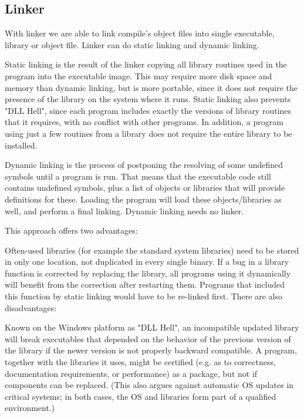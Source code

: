 \subsection{Linker}

With linker we are able to link compile's object files into single executable, library or object file.
Linker can do static linking and dynamic linking.

Static linking is the result of the linker copying all library routines used in the program into the executable image.
This may require more disk space and memory than dynamic linking, but is more portable, since it does not require the presence of the library on the system where it runs.
Static linking also prevents "DLL Hell", since each program includes exactly the versions of library routines that it requires, with no conflict with other programs. In addition, a program using just a few routines from a library does not require the entire library to be installed.

Dynamic linking is the process of postponing the resolving of some undefined symbols until a program is run.
That means that the executable code still contains undefined symbols, plus a list of objects or libraries that will provide definitions for these.
Loading the program will load these objects/libraries as well, and perform a final linking.
Dynamic linking needs no linker.

This approach offers two advantages:

Often-used libraries (for example the standard system libraries) need to be stored in only one location, not duplicated in every single binary.
If a bug in a library function is corrected by replacing the library, all programs using it dynamically will benefit from the correction after restarting them.
Programs that included this function by static linking would have to be re-linked first.
There are also disadvantages:

Known on the Windows platform as "DLL Hell", an incompatible updated library will break executables that depended on the behavior of the previous version of the library if the newer version is not properly backward compatible.
A program, together with the libraries it uses, might be certified (e.g. as to correctness, documentation requirements, or performance) as a package, but not if components can be replaced. (This also argues against automatic OS updates in critical systems; in both cases, the OS and libraries form part of a qualified environment.)

